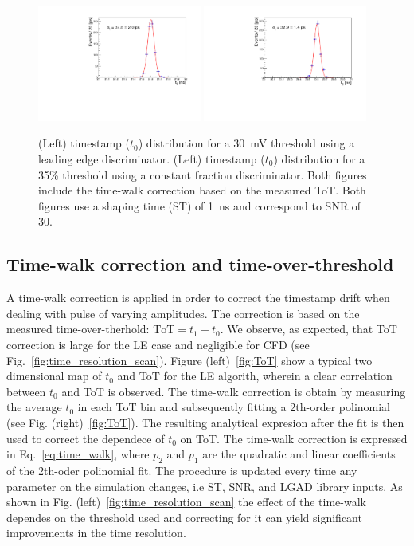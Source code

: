 \documentclass[preprint,1p]{elsarticle}
\begin{document}
  \begin{figure}[htbp]
    \centering
    \includegraphics[width=0.48\textwidth]{figs/pre_rad_st_1ns_snr_30_le_tot_threshold_30mV.pdf} \hfill
    \includegraphics[width=0.48\textwidth]{figs/pre_rad_st_1ns_snr_30_cfd_tot_threshold_35_percent_v2.pdf}
    \caption{(Left) timestamp ($t_{0}$) distribution for a 30~\si{mV} threshold using a leading edge discriminator.
    (Left) timestamp ($t_{0}$) distribution for a 35\% threshold using a constant fraction discriminator. Both figures
    include the time-walk correction based on the measured ToT.
    Both figures use a shaping time (ST) of 1~\si{ns} and correspond to SNR of 30.}
    \label{fig:time_res}
  \end{figure}


\subsection{Time-walk correction and time-over-threshold}\label{sec:tw_and_tot}
A time-walk correction is applied in order to correct the timestamp drift when dealing with pulse of varying amplitudes.
The correction is based on the measured time-over-therhold: $\mathrm{ToT} = t_{1} - t_{0}$. We observe, as expected, that ToT correction
is large for the LE case and negligible for CFD (see Fig.~\ref{fig:time_resolution_scan}). Figure (left)~\ref{fig:ToT} show a typical two dimensional map of $t_{0}$ and ToT for the
LE algorith, wherein a clear correlation between $t_{0}$ and ToT is observed. The time-walk correction is obtain by measuring the average
$t_{0}$ in each ToT bin and subsequently fitting a 2th-order polinomial (see Fig. (right)~\ref{fig:ToT}).
The resulting analytical expresion after the fit is then used to correct the dependece of $t_{0}$ on ToT. The time-walk correction is
expressed in Eq.~\ref{eq:time_walk}, where $p_{2}$ and $p_{1}$ are the quadratic and linear coefficients of the 2th-oder
polinomial fit. The procedure is updated every time any parameter on the simulation changes, i.e ST, SNR, and LGAD library inputs. As
shown in Fig. (left)~\ref{fig:time_resolution_scan} the effect of the time-walk dependes on the threshold used and correcting for it
can yield significant improvements in the time resolution.
\end{document}
